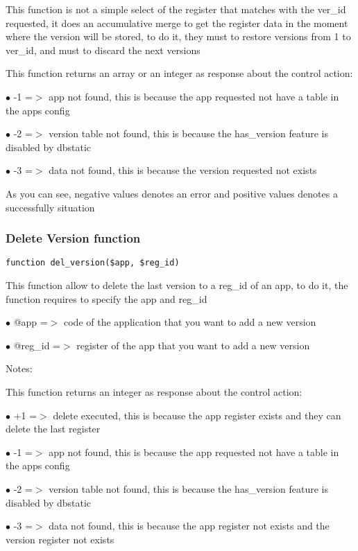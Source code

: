 \documentclass[a4paper]{article}
\begin{document}
This function is not a simple select of the register that matches with the
ver\_id requested, it does an accumulative merge to get the register data
in the moment where the version will be stored, to do it, they must to
restore versions from 1 to ver\_id, and must to discard the next versions

This function returns an array or an integer as response about the control action:

\begin{compactitem}
\item[\color{myblue}$\bullet$] -1 =$>$ app not found, this is because the app requested not have a table in the apps config
\item[\color{myblue}$\bullet$] -2 =$>$ version table not found, this is because the has\_version feature is disabled by dbstatic
\item[\color{myblue}$\bullet$] -3 =$>$ data not found, this is because the version requested not exists
\end{compactitem}

As you can see, negative values denotes an error and positive values denotes a successfully situation

\hypertarget{toc558}{}
\subsubsection{Delete Version function}

\begin{lstlisting}
function del_version($app, $reg_id)
\end{lstlisting}

This function allow to delete the last version to a reg\_id of an app, to do it,
the function requires to specify the app and reg\_id

\begin{compactitem}
\item[\color{myblue}$\bullet$] @app    =$>$ code of the application that you want to add a new version
\item[\color{myblue}$\bullet$] @reg\_id =$>$ register of the app that you want to add a new version
\end{compactitem}

Notes:

This function returns an integer as response about the control action:

\begin{compactitem}
\item[\color{myblue}$\bullet$] +1 =$>$ delete executed, this is because the app register exists and they can delete the last register
\item[\color{myblue}$\bullet$] -1 =$>$ app not found, this is because the app requested not have a table in the apps config
\item[\color{myblue}$\bullet$] -2 =$>$ version table not found, this is because the has\_version feature is disabled by dbstatic
\item[\color{myblue}$\bullet$] -3 =$>$ data not found, this is because the app register not exists and the version register not exists
\end{compactitem}
\end{document}
